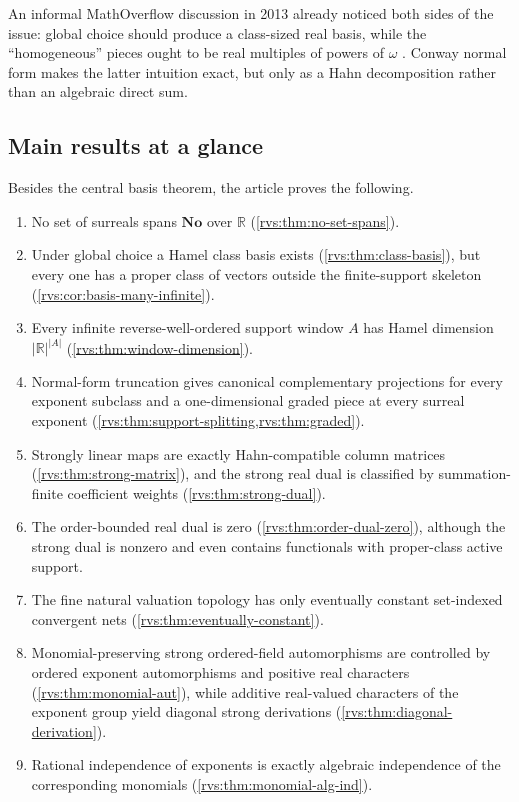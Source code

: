 \documentclass[11pt,letterpaper]{article}
\numberwithin{equation}{section}
\theoremstyle{definition}
\theoremstyle{remark}
\newcommand{\No}{\mathbf{No}}
\newcommand{\R}{\mathbb{R}}
\begin{document}
An informal MathOverflow discussion in 2013 already noticed both sides of
the issue: global choice should produce a class-sized real basis, while the
``homogeneous'' pieces ought to be real multiples of powers of \(\omega\)
\cite{MO2013}.  Conway normal form makes the latter intuition exact, but only
as a Hahn decomposition rather than an algebraic direct sum.

\subsection{Main results at a glance}\label{rvs:subsec:main-results}

Besides the central basis theorem, the article proves the following.
\begin{enumerate}[label=\textbf{\Alph*.}]
\item No set of surreals spans \(\No\) over \(\R\)
(\cref{rvs:thm:no-set-spans}).
\item Under global choice a Hamel class basis exists
(\cref{rvs:thm:class-basis}), but every one has a proper class of vectors outside
the finite-support skeleton (\cref{rvs:cor:basis-many-infinite}).
\item Every infinite reverse-well-ordered support window \(A\) has Hamel
dimension \(\lvert\R\rvert^{\lvert A\rvert}\)
(\cref{rvs:thm:window-dimension}).
\item Normal-form truncation gives canonical complementary projections for
every exponent subclass and a one-dimensional graded piece at every surreal
exponent (\cref{rvs:thm:support-splitting,rvs:thm:graded}).
\item Strongly linear maps are exactly Hahn-compatible column matrices
(\cref{rvs:thm:strong-matrix}), and the strong real dual is classified by
summation-finite coefficient weights (\cref{rvs:thm:strong-dual}).
\item The order-bounded real dual is zero
(\cref{rvs:thm:order-dual-zero}), although the strong dual is nonzero and even
contains functionals with proper-class active support.
\item The fine natural valuation topology has only eventually constant
set-indexed convergent nets (\cref{rvs:thm:eventually-constant}).
\item Monomial-preserving strong ordered-field automorphisms are controlled by
ordered exponent automorphisms and positive real characters
(\cref{rvs:thm:monomial-aut}), while additive real-valued characters of the
exponent group yield diagonal strong derivations
(\cref{rvs:thm:diagonal-derivation}).
\item Rational independence of exponents is exactly algebraic independence of
the corresponding monomials (\cref{rvs:thm:monomial-alg-ind}).
\end{enumerate}
\end{document}
